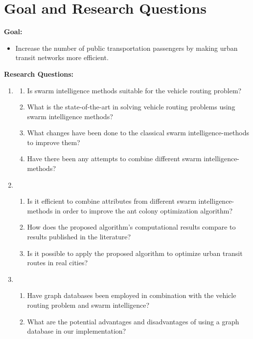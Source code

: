 \section{Goal and Research Questions}
\textbf{Goal:}
\begin{itemize}
\item \label{itm:goal} Increase the number of public transportation passengers by making urban transit networks more efficient.
\end{itemize}
\textbf{Research Questions:}
\begin{enumerate}[label=\textbf{\arabic*})]
\item \label{itm:1}
    \begin{enumerate}
    \item \label{itm:1a} Is swarm intelligence methods suitable for the vehicle routing problem?
    \item \label{itm:1b} What is the state-of-the-art in solving vehicle routing problems using swarm intelligence methods?
    \item \label{itm:1c} What changes have been done to the classical swarm intelligence-methods to improve them?
    \item \label{itm:1d} Have there been any attempts to combine different swarm intelligence-methods?
	\end{enumerate}
\item
    \begin{enumerate}
    \item \label{itm:2a} Is it efficient to combine attributes from different swarm intelligence-methods in order to improve the ant colony optimization algorithm?
    \item \label{itm:2b1} How does the proposed algorithm's computational results compare to results published in the literature?
    \item \label{itm:2b} Is it possible to apply the proposed algorithm to optimize urban transit routes in real cities?
    \end{enumerate}
\item
	\begin{enumerate}
    \item \label{itm:3b} Have graph databases been employed in combination with the vehicle routing problem and swarm intelligence?
	\item \label{itm:3a} What are the potential advantages and disadvantages of using a graph database in our implementation?
    \end{enumerate}
\end{enumerate}